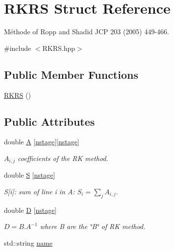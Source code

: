 \hypertarget{structRKRS}{\section{R\-K\-R\-S Struct Reference}
\label{structRKRS}
}


Méthode of Ropp and Shadid J\-C\-P 203 (2005) 449-\/466.  




{\ttfamily \#include $<$R\-K\-R\-S.\-hpp$>$}

\subsection*{Public Member Functions}
\begin{DoxyCompactItemize}
\item 
\hyperlink{structRKRS_a0abca25bc95c4207501472b94f9f4623}{R\-K\-R\-S} ()
\end{DoxyCompactItemize}
\subsection*{Public Attributes}
\begin{DoxyCompactItemize}
\item 
double \hyperlink{structRKRS_a4635865ff11a16367d0c0953d6c63d02}{A} \mbox{[}\hyperlink{structRKRS_a23e21baa68ac24250d6217d88fb218d5}{nstage}\mbox{]}\mbox{[}\hyperlink{structRKRS_a23e21baa68ac24250d6217d88fb218d5}{nstage}\mbox{]}
\begin{DoxyCompactList}\small\item\em $ A_{i,j}$ coefficients of the R\-K method. \end{DoxyCompactList}\item 
double \hyperlink{structRKRS_a96d64516ddc45beb5a9b328adff1fb1c}{S} \mbox{[}\hyperlink{structRKRS_a23e21baa68ac24250d6217d88fb218d5}{nstage}\mbox{]}
\begin{DoxyCompactList}\small\item\em S\mbox{[}i\mbox{]}\-: sum of line i in A\-: $ S_i= \sum_j A_{i,j}$. \end{DoxyCompactList}\item 
double \hyperlink{structRKRS_a5be93dfb653420eab1d0a82cf8bc300a}{D} \mbox{[}\hyperlink{structRKRS_a23e21baa68ac24250d6217d88fb218d5}{nstage}\mbox{]}
\begin{DoxyCompactList}\small\item\em $ D= B.A^{-1} $ where B are the \char`\"{}\-B\char`\"{} of R\-K method. \end{DoxyCompactList}\item 
std\-::string \hyperlink{structRKRS_a11dc1b36a8782a6e54292c2b7e094388}{name}
\end{DoxyCompactItemize}
